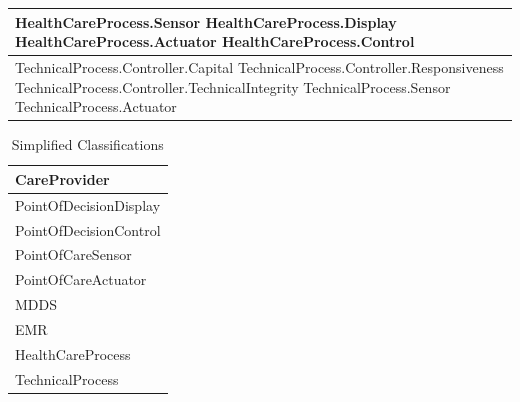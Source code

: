 \documentclass[11pt, notitlepage,abstracton,oneside]{article}   	%
\begin{document}
\begin{table}[ht]
\begin{center}
\begin{tabular}{|p{80mm}|}
HealthCareProcess.Sensor \newline HealthCareProcess.Display \newline HealthCareProcess.Actuator \newline HealthCareProcess.Control \\ \hline
TechnicalProcess.Controller.Capital \newline TechnicalProcess.Controller.Responsiveness \newline TechnicalProcess.Controller.TechnicalIntegrity \newline TechnicalProcess.Sensor \newline TechnicalProcess.Actuator \\ \hline
\end{tabular}
\end{center}
\label{default}
\end{table}%

\begin{table}[ht]
\caption{Simplified Classifications}
\label{tab:SimplifiedClassifications}
\begin{center}
\begin{tabular}{|p{40mm}|}
\hline
CareProvider \\ \hline
PointOfDecisionDisplay \\ \hline
PointOfDecisionControl \\ \hline
PointOfCareSensor \\ \hline
PointOfCareActuator \\ \hline
MDDS \\ \hline
EMR \\ \hline
HealthCareProcess \\ \hline
TechnicalProcess \\ \hline
\end{tabular}
\end{center}
\label{default}
\end{table}%


\clearpage



\end{document}
